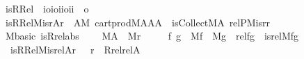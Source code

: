 \begin{isabellebody}
\endisadelimproof
\isanewline
{}\isamarkupfalse%
\isanewline
\ \ is{\isacharunderscore}{\kern0pt}RRel\ {\isacharcolon}{\kern0pt}{\isacharcolon}{\kern0pt}\ {\isachardoublequoteopen}{\isacharbrackleft}{\kern0pt}i{\isasymRightarrow}o{\isacharcomma}{\kern0pt}{\isacharbrackleft}{\kern0pt}i{\isasymRightarrow}o{\isacharcomma}{\kern0pt}i{\isacharcomma}{\kern0pt}i{\isacharbrackright}{\kern0pt}{\isasymRightarrow}o{\isacharcomma}{\kern0pt}i{\isacharcomma}{\kern0pt}i{\isacharbrackright}{\kern0pt}\ {\isasymRightarrow}\ o{\isachardoublequoteclose}\ \isanewline
\ \ {\isachardoublequoteopen}is{\isacharunderscore}{\kern0pt}RRel{\isacharparenleft}{\kern0pt}M{\isacharcomma}{\kern0pt}is{\isacharunderscore}{\kern0pt}r{\isacharcomma}{\kern0pt}A{\isacharcomma}{\kern0pt}r{\isacharparenright}{\kern0pt}\ {\isasymequiv}\ {\isasymexists}A{}{\isacharbrackleft}{\kern0pt}M{\isacharbrackright}{\kern0pt}{\isachardot}{\kern0pt}\ cartprod{\isacharparenleft}{\kern0pt}M{\isacharcomma}{\kern0pt}A{\isacharcomma}{\kern0pt}A{\isacharcomma}{\kern0pt}A{}{\isacharparenright}{\kern0pt}\ {\isasymand}\ is{\isacharunderscore}{\kern0pt}Collect{\isacharparenleft}{\kern0pt}M{\isacharcomma}{\kern0pt}A{}{\isacharcomma}{\kern0pt}\ relP{\isacharparenleft}{\kern0pt}M{\isacharcomma}{\kern0pt}is{\isacharunderscore}{\kern0pt}r{\isacharparenright}{\kern0pt}{\isacharcomma}{\kern0pt}r{\isacharparenright}{\kern0pt}{\isachardoublequoteclose}\isanewline
\isanewline
{}\isamarkupfalse%
\ {\isacharparenleft}{\kern0pt}\ M{\isacharunderscore}{\kern0pt}basic{\isacharparenright}{\kern0pt}\ is{\isacharunderscore}{\kern0pt}Rrel{\isacharunderscore}{\kern0pt}abs\ {\isacharcolon}{\kern0pt}\isanewline
\ \ \ {\isachardoublequoteopen}M{\isacharparenleft}{\kern0pt}A{\isacharparenright}{\kern0pt}{\isachardoublequoteclose}\ \ {\isachardoublequoteopen}M{\isacharparenleft}{\kern0pt}r{\isacharparenright}{\kern0pt}{\isachardoublequoteclose}\isanewline
\ \ \ \ {\isachardoublequoteopen}{\isasymAnd}\ f\ g\ {\isachardot}{\kern0pt}\ M{\isacharparenleft}{\kern0pt}f{\isacharparenright}{\kern0pt}\ {\isasymLongrightarrow}\ M{\isacharparenleft}{\kern0pt}g{\isacharparenright}{\kern0pt}\ {\isasymLongrightarrow}\ rel{\isacharparenleft}{\kern0pt}f{\isacharcomma}{\kern0pt}g{\isacharparenright}{\kern0pt}\ {\isasymlongleftrightarrow}\ is{\isacharunderscore}{\kern0pt}rel{\isacharparenleft}{\kern0pt}M{\isacharcomma}{\kern0pt}f{\isacharcomma}{\kern0pt}g{\isacharparenright}{\kern0pt}{\isachardoublequoteclose}\isanewline
\ \ \ {\isachardoublequoteopen}is{\isacharunderscore}{\kern0pt}RRel{\isacharparenleft}{\kern0pt}M{\isacharcomma}{\kern0pt}is{\isacharunderscore}{\kern0pt}rel{\isacharcomma}{\kern0pt}A{\isacharcomma}{\kern0pt}r{\isacharparenright}{\kern0pt}\ {\isasymlongleftrightarrow}\ \ r\ {\isacharequal}{\kern0pt}\ Rrel{\isacharparenleft}{\kern0pt}rel{\isacharcomma}{\kern0pt}A{\isacharparenright}{\kern0pt}{\isachardoublequoteclose}\isanewline

\end{isabellebody}
